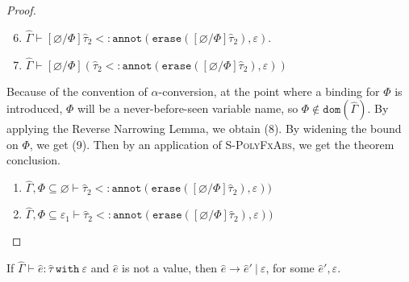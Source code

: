 \documentclass{llncs}
\newcommand{\keywadj}[1]{\mathtt{#1}}
\newcommand{\keyw}[1]{\keywadj{#1}~}
\newcommand{\kw}[1]{\keyw{ #1 }}
\newcommand{\kwa}[1]{\keywadj{ #1 }}
\newcommand{\annot}[2]{
	\keywadj{annot}(#1, #2)
}
\newcommand{\erase}[1]{
	\keywadj{erase}(#1)
}
\begin{document}
\begin{proof}
 \begin{enumerate}

	\setcounter{enumi}{5}
 	\item $\hat \Gamma \vdash [\varnothing/\Phi]\hat \tau_2 <: \annot{\erase{[\varnothing/\Phi]\hat \tau_2}}{\varepsilon}$. 
 	\item $\hat \Gamma \vdash [\varnothing/\Phi](\hat \tau_2 <: \annot{\erase{[\varnothing/\Phi]\hat \tau_2}}{\varepsilon})$

\end{enumerate}

Because of the convention of $\alpha$-conversion, at the point where a binding for $\Phi$ is introduced, $\Phi$ will be a never-before-seen variable name, so $\Phi \notin \kwa{dom}(\hat \Gamma)$. By applying the Reverse Narrowing Lemma, we obtain (8). By widening the bound on $\Phi$, we get (9). Then by an application of \textsc{S-PolyFxAbs}, we get the theorem conclusion.

\begin{enumerate}
	\item $\hat \Gamma, \Phi \subseteq \varnothing \vdash \hat \tau_2 <: \annot{\erase{[\varnothing/\Phi]\hat \tau_2}}{\varepsilon})$
	\item $\hat \Gamma, \Phi \subseteq \varepsilon_1 \vdash \hat \tau_2 <: \annot{\erase{[\varnothing/\Phi]\hat \tau_2}}{\varepsilon})$

\end{enumerate}


\end{proof}

\hrulefill


\begin{theorem}[Progress]
If $\hat \Gamma \vdash \hat e: \hat \tau~\kw{with} \varepsilon$ and $\hat e$ is not a value, then $\hat e \longrightarrow \hat e'~|~\varepsilon$, for some $\hat e', \varepsilon$.
\end{theorem}
\end{document}
